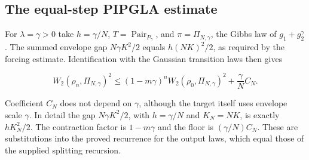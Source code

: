 \documentclass[11pt,a4paper]{report}
\begin{document}
\subsection{\texorpdfstring{The equal-step PIPGLA estimate}{The equal-step PIPGLA estimate}}
\label{report-step-ProximalLangevin-SplittingEndpoint-lean-4}


For \(\lambda=\gamma>0\) take \(h=\gamma/N\), \(T=\operatorname{Pair}_{P_\gamma}\), and \(\pi=\Pi_{N,\gamma}\), the Gibbs law of \(g_1+g_2^\gamma\). The summed envelope gap \(N\gamma K^2/2\) equals \(h(NK)^2/2\), as required by the forcing estimate. Identification with the Gaussian transition laws then gives

\[W_2(\rho_n,\Pi_{N,\gamma})^2\le(1-m\gamma)^nW_2(\rho_0,\Pi_{N,\gamma})^2+\frac\gamma N C_N.\]

Coefficient \(C_N\) does not depend on \(\gamma\), although the target itself uses envelope scale \(\gamma\). In detail the gap \(N\gamma K^2/2\), with \(h=\gamma/N\) and \(K_N=NK\), is exactly \(hK_N^2/2\). The contraction factor is \(1-m\gamma\) and the floor is \((\gamma/N)C_N\). These are substitutions into the proved recurrence for the output laws, which equal those of the supplied splitting recursion.
\end{document}
